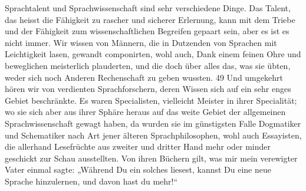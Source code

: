 Sprachtalent und Sprachwissenschaft sind sehr verschiedene Dinge. Das Talent, das heisst die Fähigkeit zu rascher und sicherer Erlernung, kann mit dem Triebe und der Fähigkeit zum wissenschaftlichen Begreifen gepaart sein, aber es ist es nicht immer. Wir wissen von Männern, die in Dutzenden von Sprachen mit Leichtigkeit lasen, gewandt componirten, wohl auch, Dank einem feinen Ohre und beweglichen  meisterlich plauderten, und die doch über alles das, was sie übten, weder sich noch Anderen Rechenschaft zu geben wussten.  {\textbar}{\textbar}49{\textbar}{\textbar}\label{sp.49}  Und umgekehrt hören wir von verdienten Sprachforschern, deren Wissen sich auf ein sehr enges Gebiet beschränkte. Es waren Specialisten, vielleicht Meister in ihrer Specialität; wo sie sich aber aus ihrer Sphäre heraus auf das weite Gebiet der allgemeinen Sprachwissenschaft gewagt haben, da wurden sie im günstigsten Falle Dogmatiker und Schema\-\label{fp.50}tiker nach Art jener älteren Sprachphilosophen, wohl auch Essayisten, die allerhand Lesefrüchte aus zweiter und dritter Hand mehr oder minder geschickt zur Schau ausstellten. Von ihren Büchern gilt, was mir mein verewigter Vater einmal sagte: „Während Du ein solches liesest, kannst Du eine neue Sprache hinzulernen, und davon hast du mehr!“ 

